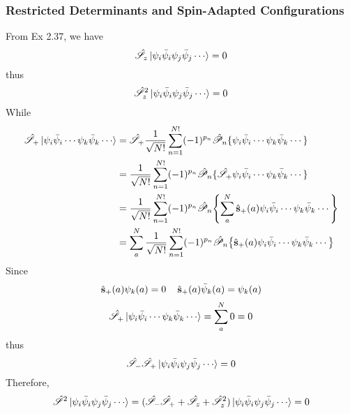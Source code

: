 \documentclass[a4paper]{article}
\begin{document}
\subsubsection{Restricted Determinants and Spin-Adapted Configurations}
From Ex 2.37, we have
\begin{equation}\label{key}
\hat{\mathscr{S}}_z \ket{\psi_i\bar{\psi}_i\psi_j\bar{\psi}_j\cdots} = 0
\end{equation}
thus
\begin{equation}\label{key}
\hat{\mathscr{S}}_z^2 \ket{\psi_i\bar{\psi}_i\psi_j\bar{\psi}_j\cdots} = 0
\end{equation}
While
\begin{align}
\hat{\mathscr{S}}_+ \ket{\psi_i\bar{\psi}_i\cdots\psi_k\bar{\psi}_k\cdots} &= \hat{\mathscr{S}}_+ \dfrac{1}{\sqrt{N!}}\sum_{n=1}^{N!}(-1)^{p_n} \hat{\mathscr{P}}_n\{\psi_i\bar{\psi}_i\cdots\psi_k\bar{\psi}_k\cdots\} \notag\\
&= \dfrac{1}{\sqrt{N!}}\sum_{n=1}^{N!}(-1)^{p_n} \hat{\mathscr{P}}_n\{\hat{\mathscr{S}}_+ \psi_i\bar{\psi}_i\cdots\psi_k\bar{\psi}_k\cdots\}  \notag\\\
&= \dfrac{1}{\sqrt{N!}}\sum_{n=1}^{N!}(-1)^{p_n} \hat{\mathscr{P}}_n\qty{\sum_a^N \operatorname{\hat{\vb{s}}}_+(a) \psi_i\bar{\psi}_i\cdots\psi_k\bar{\psi}_k\cdots}  \notag\\
&= \sum_a^N \dfrac{1}{\sqrt{N!}}\sum_{n=1}^{N!}(-1)^{p_n} \hat{\mathscr{P}}_n\qty{ \operatorname{\hat{\vb{s}}}_+(a) \psi_i\bar{\psi}_i\cdots\psi_k\bar{\psi}_k\cdots}  
\end{align}
Since 
\begin{equation}\label{key}
\operatorname{\hat{\vb{s}}}_+(a)\psi_k(a) = 0 \quad \operatorname{\hat{\vb{s}}}_+(a)\bar{\psi}_k(a) = \psi_k(a)
\end{equation}
\begin{align}
\hat{\mathscr{S}}_+ \ket{\psi_i\bar{\psi}_i\cdots\psi_k\bar{\psi}_k\cdots} 
= \sum_a^N 0 = 0
\end{align}
thus
\begin{equation}\label{key}
\hat{\mathscr{S}}_-\hat{\mathscr{S}}_+ \ket{\psi_i\bar{\psi}_i\psi_j\bar{\psi}_j\cdots} 
= 0
\end{equation}
Therefore,
\begin{equation}\label{key}
\hat{\mathscr{S}}^2 \ket{\psi_i\bar{\psi}_i\psi_j\bar{\psi}_j\cdots}  = (\hat{\mathscr{S}}_-\hat{\mathscr{S}}_+ + \hat{\mathscr{S}}_z + \hat{\mathscr{S}}_z^2)\ket{\psi_i\bar{\psi}_i\psi_j\bar{\psi}_j\cdots} = 0
\end{equation}
\end{document}
